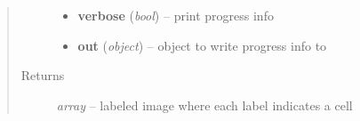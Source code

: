 \documentclass[letterpaper,10pt,english]{sphinxmanual}
\begin{document}
\begin{fulllineitems}
\begin{quote}
\begin{description}
\begin{itemize}
\item {} 
\textbf{verbose} (\emph{bool}) --
print progress info

\item {} 
\textbf{out} (\emph{object}) --
object to write progress info to

\end{itemize}

\item[{Returns}] \leavevmode
\emph{array} --
labeled image where each label indicates a cell

\end{description}\end{quote}

\end{fulllineitems}

\end{document}
